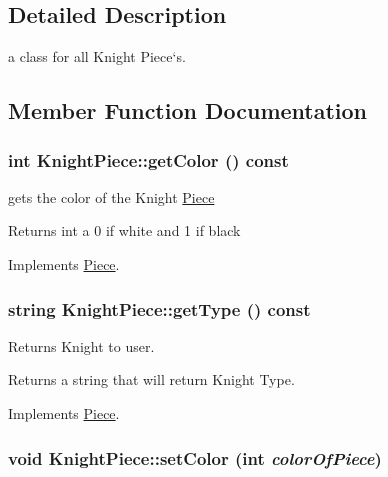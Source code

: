\subsection{Detailed Description}
a class for all Knight Piece`s. 

\subsection{Member Function Documentation}
\hypertarget{classKnightPiece_ab8ef95a1a625e461ada96e4692599770}{
\subsubsection[{getColor}]{\setlength{\rightskip}{0pt plus 5cm}int KnightPiece::getColor () const}}
\label{classKnightPiece_ab8ef95a1a625e461ada96e4692599770}


gets the color of the Knight \hyperlink{classPiece}{Piece} \begin{DoxyReturn}{Returns}
int a 0 if white and 1 if black 
\end{DoxyReturn}


Implements \hyperlink{classPiece_a1376072d4815719e60253ce5688df95c}{Piece}.\hypertarget{classKnightPiece_a3b141e4014d09bba70625ccb2129efcc}{
\subsubsection[{getType}]{\setlength{\rightskip}{0pt plus 5cm}string KnightPiece::getType () const}}
\label{classKnightPiece_a3b141e4014d09bba70625ccb2129efcc}


Returns Knight to user. \begin{DoxyReturn}{Returns}
a string that will return Knight Type. 
\end{DoxyReturn}


Implements \hyperlink{classPiece_a5b88fcd786bb30b345b24fbc3ab24ab9}{Piece}.\hypertarget{classKnightPiece_a928091c9100f4e3bc2bb2d10535ccc49}{
\subsubsection[{setColor}]{\setlength{\rightskip}{0pt plus 5cm}void KnightPiece::setColor (int {\em colorOfPiece})}}
\label{classKnightPiece_a928091c9100f4e3bc2bb2d10535ccc49}


